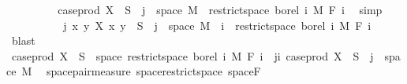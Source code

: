 \begin{isabellebody}
\ \ \ \ \ \ \isamarkupfalse%
\ \isamarkupfalse%
\ {\isachardoublequoteopen}case{\isacharunderscore}{\kern0pt}prod\ X\ {\isacharminus}{\kern0pt}{\isacharbackquote}{\kern0pt}\ S\ {\isasyminter}\ {\isacharbraceleft}{\kern0pt}j{\isacharbraceright}{\kern0pt}\ {\isasymtimes}\ space\ M\ {\isasymin}\ restrict{\isacharunderscore}{\kern0pt}space\ borel\ {\isacharbraceleft}{\kern0pt}{}{\isachardot}{\kern0pt}{\isachardot}{\kern0pt}i{\isacharbraceright}{\kern0pt}\ {\isasymOtimes}\isactrlsub M\ F\ i{\isachardoublequoteclose}\ \isamarkupfalse%
\ simp\isanewline
\ \ \ \ \isacommand{{\isacharbraceright}{\kern0pt}}\isamarkupfalse%
\isanewline
\ \ \ \ \isamarkupfalse%
\ {\isachardoublequoteopen}{\isacharparenleft}{\kern0pt}{\isasymlambda}j{\isachardot}{\kern0pt}\ {\isacharparenleft}{\kern0pt}{\isasymlambda}{\isacharparenleft}{\kern0pt}x{\isacharcomma}{\kern0pt}\ y{\isacharparenright}{\kern0pt}{\isachardot}{\kern0pt}\ X\ x\ y{\isacharparenright}{\kern0pt}\ {\isacharminus}{\kern0pt}{\isacharbackquote}{\kern0pt}\ S\ {\isasyminter}\ {\isacharbraceleft}{\kern0pt}j{\isacharbraceright}{\kern0pt}\ {\isasymtimes}\ space\ M{\isacharparenright}{\kern0pt}\ {\isacharbackquote}{\kern0pt}\ {\isacharbraceleft}{\kern0pt}{\isachardot}{\kern0pt}{\isachardot}{\kern0pt}i{\isacharbraceright}{\kern0pt}\ {\isasymsubseteq}\ restrict{\isacharunderscore}{\kern0pt}space\ borel\ {\isacharbraceleft}{\kern0pt}{}{\isachardot}{\kern0pt}{\isachardot}{\kern0pt}i{\isacharbraceright}{\kern0pt}\ {\isasymOtimes}\isactrlsub M\ F\ i{\isachardoublequoteclose}\ \isamarkupfalse%
\ blast\isanewline
\ \ \ \ \isamarkupfalse%
\ \isamarkupfalse%
\ {\isachardoublequoteopen}case{\isacharunderscore}{\kern0pt}prod\ X\ {\isacharminus}{\kern0pt}{\isacharbackquote}{\kern0pt}\ S\ {\isasyminter}\ space\ {\isacharparenleft}{\kern0pt}restrict{\isacharunderscore}{\kern0pt}space\ borel\ {\isacharbraceleft}{\kern0pt}{}{\isachardot}{\kern0pt}{\isachardot}{\kern0pt}i{\isacharbraceright}{\kern0pt}\ {\isasymOtimes}\isactrlsub M\ F\ i{\isacharparenright}{\kern0pt}\ {\isacharequal}{\kern0pt}\ {\isacharparenleft}{\kern0pt}{\isasymUnion}j{\isasymle}i{\isachardot}{\kern0pt}\ case{\isacharunderscore}{\kern0pt}prod\ X\ {\isacharminus}{\kern0pt}{\isacharbackquote}{\kern0pt}\ S\ {\isasyminter}\ {\isacharbraceleft}{\kern0pt}j{\isacharbraceright}{\kern0pt}\ {\isasymtimes}\ space\ M{\isacharparenright}{\kern0pt}{\isachardoublequoteclose}\ \isamarkupfalse%
\ space{\isacharunderscore}{\kern0pt}pair{\isacharunderscore}{\kern0pt}measure\ space{\isacharunderscore}{\kern0pt}restrict{\isacharunderscore}{\kern0pt}space\ space{\isacharunderscore}{\kern0pt}F\ \isamarkupfalse%

\end{isabellebody}
